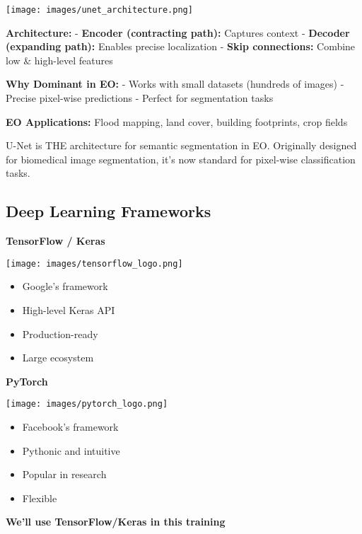 \documentclass[
  letterpaper,
  DIV=11,
  numbers=noendperiod]{scrartcl}
\providecommand{\tightlist}{%
  \setlength{\itemsep}{0pt}\setlength{\parskip}{0pt}}
\begin{document}
\begin{center}
\texttt{[image: images/unet\_architecture.png]}
\end{center}

\textbf{Architecture:} - \textbf{Encoder (contracting path):} Captures
context - \textbf{Decoder (expanding path):} Enables precise
localization - \textbf{Skip connections:} Combine low \& high-level
features

\textbf{Why Dominant in EO:} - Works with small datasets (hundreds of
images) - Precise pixel-wise predictions - Perfect for segmentation
tasks

\textbf{EO Applications:} Flood mapping, land cover, building
footprints, crop fields

U-Net is THE architecture for semantic segmentation in EO. Originally
designed for biomedical image segmentation, it's now standard for
pixel-wise classification tasks.

\subsection{Deep Learning Frameworks}\label{deep-learning-frameworks}

\textbf{TensorFlow / Keras}

\texttt{[image: images/tensorflow\_logo.png]}

\begin{itemize}
\tightlist
\item
  Google's framework
\item
  High-level Keras API
\item
  Production-ready
\item
  Large ecosystem
\end{itemize}

\textbf{PyTorch}

\texttt{[image: images/pytorch\_logo.png]}

\begin{itemize}
\tightlist
\item
  Facebook's framework
\item
  Pythonic and intuitive
\item
  Popular in research
\item
  Flexible
\end{itemize}

\textbf{We'll use TensorFlow/Keras in this training}
\end{document}
